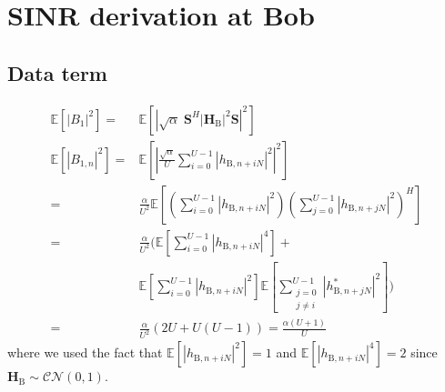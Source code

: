 \documentclass[journal,comsoc]{IEEEtran}
\let\MYoriglatexcaption\caption
\renewcommand{\caption}[2][\relax]{\MYoriglatexcaption[#2]{#2}}
\newcommand{\module}[1]{\left|#1\right|}
\newcommand{\EX}[1]{\mathbb{E} \left[#1\right]}%
\newcommand{\HB}{\textbf{H}_{\text{B}}}
\newcommand{\spread}{\textbf{S}}
\begin{document}








\appendices
\section{SINR derivation at Bob}\label{sec:sinr-derivation-app}


\subsection{Data term}\label{sec:data-term-app}
\begin{equation}
	\begin{split}
		\EX{|B_1|^2} =& \EX{\module{\sqrt{\alpha} \; \spread^H \module{\HB}^2 \spread}^2} \\
		\EX{|B_{1,n}|^2} =&\EX{\left|\frac{\sqrt{\alpha}}{U}\sum_{i=0}^{U-1} \left| h_{\text{B}, n + iN}\right|^2\right|^2}  \\
		=& \frac{\alpha}{U^2} \EX{\left(\sum_{i=0}^{U-1} \left| h_{\text{B}, n + iN}\right|^2\right) \left(\sum_{j=0}^{U-1} \left| h_{\text{B}, n + jN}\right|^2\right)^H}\\
		=&  \frac{\alpha}{U^2} \Big(\EX{\sum_{i=0}^{U-1}\left| h_{\text{B}, n + iN}\right|^4} +\\
		& \EX{\sum_{i=0}^{U-1}\left| h_{\text{B}, n + iN}\right|^2}\EX{\sum_{\substack{j=0 \\ j\neq i}}^{U-1} | h^*_{\text{B}, n + jN}|^2} \Big) \\
		=& \frac{\alpha}{U^2} \left( 2U + U(U-1)\right) = \frac{\alpha (U+1)}{U}
	\end{split}
	\label{eq:appA:data_bob-app}
\end{equation}
where we used the fact that $\EX{\left| h_{\text{B}, n + iN}\right|^2} = 1$ and $\EX{\left| h_{\text{B}, n + iN}\right|^4} = 2$ since $\HB \sim \mathcal{CN}(0,1)$.
\end{document}
